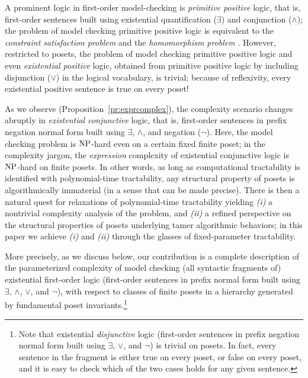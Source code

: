 \documentclass[usletter]{article}
\begin{document}
A prominent logic in first-order model-checking is \emph{primitive positive} logic, 
that is, first-order sentences built using existential quantification ($\exists$) 
and conjunction ($\wedge$); the problem of model checking primitive positive logic is 
equivalent to the \emph{constraint satisfaction problem} and the \emph{homomorphism problem} \cite{FederVardi98}.  However, 
restricted to posets, the problem of model checking primitive positive logic 
and even \emph{existential positive} logic, obtained from primitive positive logic by including disjunction ($\vee$) in the logical vocabulary, is trivial; 
because of reflexivity, every existential positive sentence is true on every poset!


As we observe (Proposition~\ref{pr:exprcomplex}), the complexity scenario changes abruptly 
in \emph{existential conjunctive} logic, that is, 
first-order sentences in prefix negation normal form built using 
$\exists$, $\wedge$, and negation ($\neg$).  Here, 
the model checking problem is $\textup{NP}$-hard 
even on a certain fixed finite poset; in the complexity jargon, 
the \emph{expression} complexity of 
existential conjunctive logic 
is $\textup{NP}$-hard on finite posets.   
In other words, as long as computational tractability is identified with 
polynomial-time tractability, any structural property of posets is 
algorithmically immaterial (in a sense that can be made precise).  There is then a natural quest 
for relaxations of polynomial-time tractability yielding 
\textit{(i)} a nontrivial complexity analysis of the problem, 
and \textit{(ii)} a refined perspective on the structural properties of posets 
underlying tamer algorithmic behaviors; in this paper 
we achieve \textit{(i)} and \textit{(ii)} through the glasses of fixed-parameter tractability.  

More precisely, as we discuss below, our contribution is a complete description of 
the parameterized complexity of model checking (all syntactic fragments of) existential first-order logic 
(first-order sentences in prefix normal form built using $\exists$, $\wedge$, $\vee$, and $\neg$), 
with respect to classes of finite posets in a hierarchy 
generated by fundamental poset invariants.\footnote{Note that existential \emph{disjunctive} logic (first-order sentences in prefix negation normal form 
built using $\exists$, $\vee$, and $\neg$) is trivial on posets.  
In fact, every sentence in the fragment is either true on every poset, or false on every poset, 
and it is easy to check which of the two cases holds for any given sentence.}  
\end{document}
